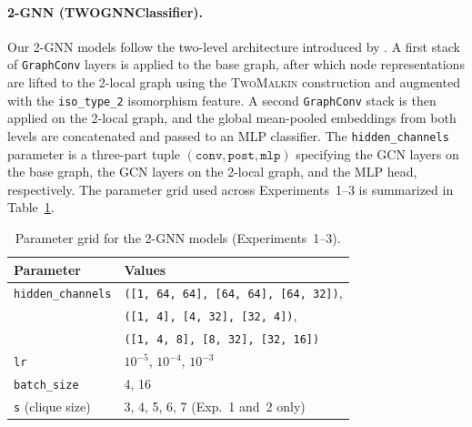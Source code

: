 








\paragraph{2-GNN (TWOGNNClassifier).}
Our 2-GNN models follow the two-level architecture introduced by \citet{MorrisEtAl2019}. A first stack of \texttt{GraphConv} layers is applied to the base graph, after which node representations are lifted to the 2-local graph using the \textsc{TwoMalkin} construction and augmented with the \texttt{iso\_type\_2} isomorphism feature. A second \texttt{GraphConv} stack is then applied on the 2-local graph, and the global mean-pooled embeddings from both levels are concatenated and passed to an MLP classifier. The \texttt{hidden\_channels} parameter is a three-part tuple $(\texttt{conv}, \texttt{post}, \texttt{mlp})$ specifying the GCN layers on the base graph, the GCN layers on the 2-local graph, and the MLP head, respectively. The parameter grid used across Experiments~1–3 is summarized in Table~\ref{table:2gnn-grid}.

\begin{table}[h]
\centering
\begin{tabular}{ll}
\toprule
\textbf{Parameter} & \textbf{Values} \\
\midrule
\texttt{hidden\_channels} 
& \texttt{([1, 64, 64], [64, 64], [64, 32])}, \\
& \texttt{([1, 4], [4, 32], [32, 4])}, \\
& \texttt{([1, 4, 8], [8, 32], [32, 16])} \\
\texttt{lr} & $10^{-5}$, $10^{-4}$, $10^{-3}$ \\
\texttt{batch\_size} & 4, 16 \\
\texttt{s} (clique size) & 3, 4, 5, 6, 7 (Exp.~1 and~2 only) \\
\bottomrule
\end{tabular}
\caption{Parameter grid for the 2-GNN models (Experiments~1–3).}
\label{table:2gnn-grid}
\end{table}

